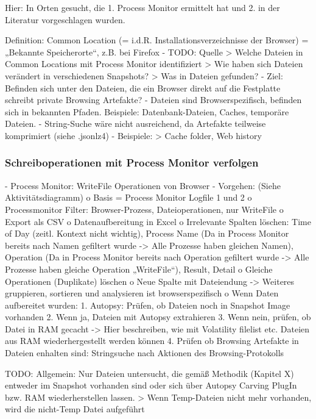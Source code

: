 	Hier: In Orten gesucht, die 1. Process Monitor ermittelt hat und 2. in der Literatur vorgeschlagen wurden.

Definition: Common Location
	(= i.d.R. Installationsverzeichnisse der Browser) = „Bekannte Speicherorte“, z.B. bei Firefox   	
	- TODO: Quelle
		> Welche Dateien in Common Locations mit Process Monitor identifiziert
		> Wie haben sich Dateien verändert in verschiedenen Snapshots?
		> Was in Dateien gefunden?	
	-	Ziel: Befinden sich unter den Dateien, die ein Browser direkt auf die Festplatte schreibt private Browsing Artefakte?
	-	Dateien sind Browserspezifisch, befinden sich in bekannten Pfaden. Beispiele: Datenbank-Dateien, Caches, temporäre Dateien.
	-	String-Suche wäre nicht ausreichend, da Artefakte teilweise komprimiert (siehe .jsonlz4)	
	- Beispiele:
		> Cache folder, Web history \cite{Montasari.2015}

\subsubsection*{Schreiboperationen mit Process Monitor verfolgen}
- Process Monitor: WriteFile Operationen von Browser
- Vorgehen: (Siehe Aktivitätsdiagramm)
	o	Basis = Process Monitor Logfile 1 und 2
	o	Processmonitor Filter: Browser-Prozess, Dateioperationen, nur WriteFile
	o	Export als CSV
	o	Datenaufbereitung in Excel
	o	Irrelevante Spalten löschen: Time of Day (zeitl. Kontext nicht wichtig), Process Name (Da in Process Monitor bereits nach Namen gefiltert wurde -> Alle Prozesse haben gleichen Namen), Operation (Da in Process Monitor bereits nach Operation gefiltert wurde -> Alle Prozesse haben gleiche Operation „WriteFile“), Result, Detail
	o	Gleiche Operationen (Duplikate) löschen
	o	Neue Spalte mit Dateiendung
	-> Weiteres gruppieren, sortieren und analysieren ist browserspezifisch
	o	Wenn Daten aufbereitet wurden: 
	1.	Autopsy: Prüfen, ob Dateien noch in Snapshot Image vorhanden
	2.	Wenn ja, Dateien mit Autopsy extrahieren 
	3.	Wenn nein, prüfen, ob Datei in RAM gecacht
	-> Hier beschreiben, wie mit Volatility filelist etc. Dateien aus RAM wiederhergestellt werden können
	4.	Prüfen ob Browsing Artefakte in Dateien enhalten sind: Stringsuche nach Aktionen des Browsing-Protokolls
	
	TODO:
	Allgemein: Nur Dateien untersucht, die gemäß Methodik (Kapitel X) entweder im Snapshot vorhanden sind oder sich über Autopsy Carving PlugIn bzw. RAM wiederherstellen lassen.
	> Wenn Temp-Dateien nicht mehr vorhanden, wird die nicht-Temp Datei aufgeführt
	
